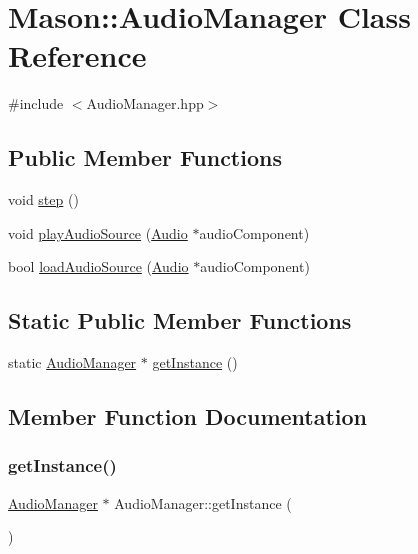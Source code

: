 \hypertarget{class_mason_1_1_audio_manager}{}\section{Mason\+:\+:Audio\+Manager Class Reference}
\label{class_mason_1_1_audio_manager}


{\ttfamily \#include $<$Audio\+Manager.\+hpp$>$}

\subsection*{Public Member Functions}
\begin{DoxyCompactItemize}
\item 
void \hyperlink{class_mason_1_1_audio_manager_a81eb2ff2bc2d1242e532c208b32d17ec}{step} ()
\item 
void \hyperlink{class_mason_1_1_audio_manager_a061109c8b24705aa7ed1a5c28b9a4cd1}{play\+Audio\+Source} (\hyperlink{class_mason_1_1_audio}{Audio} $\ast$audio\+Component)
\item 
bool \hyperlink{class_mason_1_1_audio_manager_ae8264e1149615ee5b3cc54317bd0fe4a}{load\+Audio\+Source} (\hyperlink{class_mason_1_1_audio}{Audio} $\ast$audio\+Component)
\end{DoxyCompactItemize}
\subsection*{Static Public Member Functions}
\begin{DoxyCompactItemize}
\item 
static \hyperlink{class_mason_1_1_audio_manager}{Audio\+Manager} $\ast$ \hyperlink{class_mason_1_1_audio_manager_a77de22887544ce37ae13d7c4d5cf7a79}{get\+Instance} ()
\end{DoxyCompactItemize}


\subsection{Member Function Documentation}
\hypertarget{class_mason_1_1_audio_manager_a77de22887544ce37ae13d7c4d5cf7a79}{}\label{class_mason_1_1_audio_manager_a77de22887544ce37ae13d7c4d5cf7a79} 
\subsubsection{\texorpdfstring{get\+Instance()}{getInstance()}}
{\footnotesize\ttfamily \hyperlink{class_mason_1_1_audio_manager}{Audio\+Manager} $\ast$ Audio\+Manager\+::get\+Instance (\begin{DoxyParamCaption}{ }\end{DoxyParamCaption})\hspace{0.3cm}{\ttfamily [static]}}


